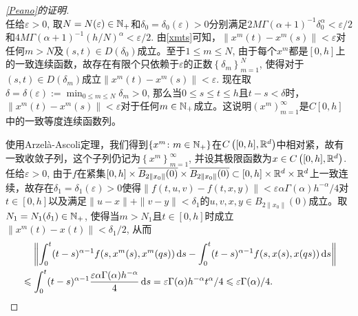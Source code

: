 \begin{proof}[\cref{Peano}的证明]
\begin{equation}
    \end{equation}
    任给$\varepsilon>0$, 取$N=N(\varepsilon)\in \mathbb{N_+}$和$\delta_0=\delta_0(\varepsilon)>0$分别满足$2M\Gamma(\alpha+1)^{-1}\delta_0^\alpha < \varepsilon/2$和$4M\Gamma(\alpha+1)^{-1}(h/N)^\alpha<\varepsilon/2$. 由\cref{xmts}可知，$\left\| x^m(t)-x^m(s) \right\| < \varepsilon$对任何$m>N$及$(s,t)\in D(\delta_0)$成立。至于$1\leqslant m\leqslant N$, 由于每个$x^m$都是$[0,h]$上的一致连续函数，故存在有限个只依赖于$\varepsilon$的正数$\left\{\delta_m\right\}_{m=1}^N$, 使得对于$(s,t)\in D(\delta_m)$成立$\left\| x^m(t)-x^m(s) \right\| < \varepsilon$. 现在取$\delta=\delta(\varepsilon):=\min_{0\leqslant m\leqslant N} \delta_m>0$, 那么当$0\leqslant s\leqslant t \leqslant h$且$t-s<\delta$时，$\left\| x^m(t)-x^m(s) \right\| < \varepsilon$对于任何$m\in \mathbb{N_+}$成立。这说明$\left(x^m\right)_{m=1}^\infty$是$C[0,h]$中的一致等度连续函数列。

    使用Arzel\`a-Ascoli定理，我们得到$\left\{x^m\colon m\in \mathbb{N_+}\right\}$在$C\left([0,h],\mathbb{R}^d\right)$中相对紧，故有一致收敛子列，这个子列仍记为$\left\{x^m\right\}_{m=1}^\infty$, 并设其极限函数为$x\in C\left([0,h],\mathbb{R}^d\right)$. 任给$\varepsilon>0$, 由于$f$在紧集$[0,h]\times \overline{B_{2\|x_0\|}(0)}\times \overline{B_{2\|x_0\|}(0)}\subset [0,h]\times \mathbb{R}^d\times \mathbb{R}^d$上一致连续，故存在$\delta_1=\delta_1(\varepsilon)>0$使得$\|f(t,u,v)-f(t,x,y)\|<\varepsilon \alpha \Gamma(\alpha) h^{-\alpha} / 4$对$t\in [0,h]$以及满足$\|u-x\|+\|v-y\|<\delta_1$的$u,v,x,y\in B_{2\|x_0\|}(0)$成立。取$N_1=N_1(\delta_1)\in \mathbb{N_+}$, 使得当$m>N_1$且$t\in [0,h]$时成立$\left\|x^m(t)-x(t)\right\|<\delta_1/2$, 从而
    \begin{equation}\label{xmx}
        \begin{aligned}
            &\relphantom{\leqslant}\left\|\int_{0}^{t}(t-s)^{\alpha-1}f(s,x^m(s),x^m(qs))\differential s - \int_{0}^{t}(t-s)^{\alpha-1}f(s,x(s),x(qs))\differential s\right\|
            \\ &\leqslant \int_{0}^{t}(t-s)^{\alpha-1} \frac{\varepsilon \alpha \Gamma(\alpha) h^{-\alpha}}{4} \differential s=\varepsilon \Gamma(\alpha) h^{-\alpha} t^\alpha / 4 \leqslant \varepsilon\Gamma(\alpha)/4.
        \end{aligned}
    \end{equation}


\end{proof}

